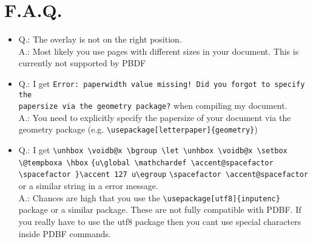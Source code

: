 \documentclass[11pt]{scrartcl}
\begin{document}
\section{F.A.Q.}
\begin{itemize}
\item Q.: The overlay is not on the right position.\\
A.: Most likely you use pages with different sizes in your document. This is currently not supported by PBDF 
\item Q.: I get \verb|Error: paperwidth value missing! Did you forgot to specify the| \\ \verb|papersize via the geometry package?| when compiling my document.\\
A.: You need to explicitly specify the papersize of your document via the geometry package (e.g. \verb|\usepackage[letterpaper]{geometry}|)
\item Q.: I get \verb|\unhbox \voidb@x \bgroup \let \unhbox \voidb@x \setbox \@tempboxa \hbox| \verb|{u\global \mathchardef \accent@spacefactor \spacefactor }\accent 127 u\egroup| \newline \verb|\spacefactor \accent@spacefactor| or a similar string in a error message.\\
A.: Chances are high that you use the \verb|\usepackage[utf8]{inputenc}| package or a similar package. These are not fully compatible with PDBF. If you really have to use the utf8 package then you cant use special characters inside PDBF commands.
\end{itemize}
\end{document}
